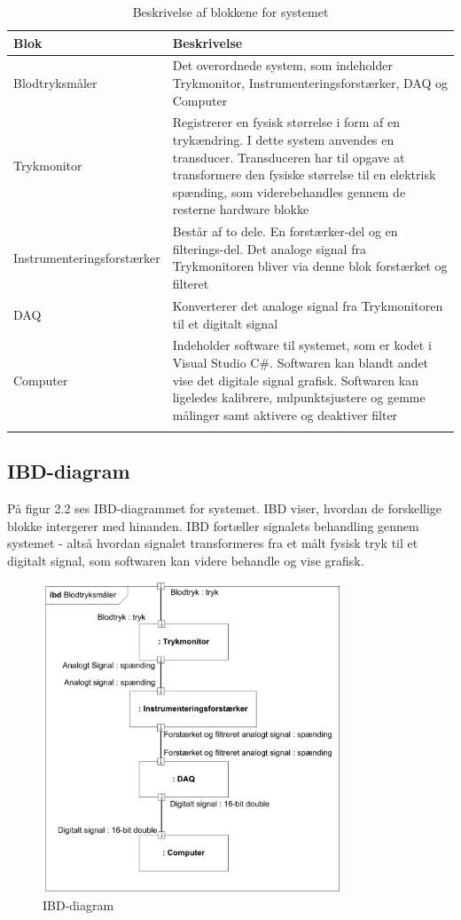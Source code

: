 \begin{longtabu} to 
	\textbf{Blok} &	\textbf{Beskrivelse} \\[-1ex]
	\midrule
	Blodtryksmåler & Det overordnede system, som indeholder Trykmonitor, Instrumenteringsforstærker, DAQ og Computer\\[-1ex]
	Trykmonitor & Registrerer en fysisk størrelse i form af en trykændring. I dette system anvendes en transducer. Transduceren har til opgave at transformere den fysiske størrelse til en elektrisk spænding, som viderebehandles gennem de resterne hardware blokke  \\[-1ex]
	Instrumenteringsforstærker & Består af to dele. En forstærker-del og en filterings-del. Det analoge signal fra Trykmonitoren bliver via denne blok forstærket og filteret\\[-1ex]
	DAQ & Konverterer det analoge signal fra Trykmonitoren til et digitalt signal\\[-1ex]
	Computer & Indeholder software til systemet, som er kodet i Visual Studio C\#. Softwaren kan blandt andet vise det digitale signal grafisk. Softwaren kan ligeledes kalibrere, nulpunktsjustere og gemme målinger samt aktivere og deaktiver filter\\[-1ex]
	\caption{Beskrivelse af blokkene for systemet}
	\end{longtabu}
	
\subsection{IBD-diagram}
På figur 2.2 ses IBD-diagrammet for systemet. IBD viser, hvordan de forskellige blokke intergerer med hinanden. IBD fortæller signalets behandling gennem systemet - altså hvordan signalet transformeres fra et målt fysisk tryk til et digitalt signal, som softwaren kan videre behandle og vise grafisk. 

\begin{figure}[H]
	\centering
	\includegraphics[width=0.8\textwidth]{Figurer/Snip20151102_7}
	\caption{IBD-diagram}
	\label{fig:IBD-diagram}
\end{figure}

